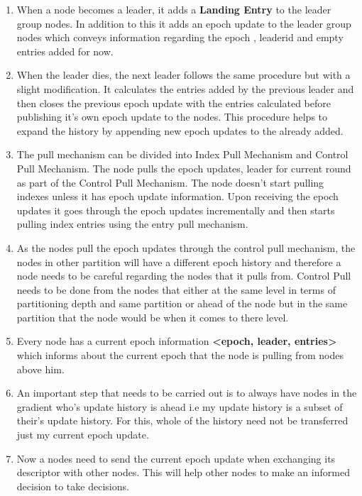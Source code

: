 \documentclass[a4paper, 11pt]{article}
\begin{document}
\begin{enumerate}

\item When a node becomes a leader, it adds a \textbf{Landing Entry} to the leader group nodes. In addition to this it adds an epoch update to the leader group nodes which conveys information regarding the epoch , leaderid and empty entries added for now.

\item When the leader dies, the next leader follows the same procedure but with a slight modification. It calculates the entries added by the previous leader and then closes the previous epoch update with the entries calculated before publishing it's own epoch update to the nodes. This procedure helps to expand the history by appending new epoch updates to the already added.

\item The pull mechanism can be divided into Index Pull Mechanism and Control Pull Mechanism. The node pulls the epoch updates, leader for current round as part of the Control Pull Mechanism. The node doesn't start pulling indexes unless it has epoch update information. Upon receiving the epoch updates it goes through the epoch updates incrementally and then starts pulling index entries using the entry pull mechanism.

\item As the nodes pull the epoch updates through the control pull mechanism, the nodes in other partition will have a different epoch history and therefore a node needs to be careful regarding the nodes that it pulls from.
Control Pull needs to be done from the nodes that either at the same level in terms of partitioning depth and same partition or ahead of the node but in the same partition that the node would be when it comes to there level.

\item Every node has a current epoch information \textbf{ \textless epoch, leader, entries\textgreater } which informs about the current epoch that the node is pulling from nodes above him. 

\item An important step that needs to be carried out is to always have nodes in the gradient who's update history is ahead i.e my update history is a subset of their's update history. For this, whole of the history need not be transferred just my current epoch update. 

\item Now a nodes need to send the current epoch update when exchanging its descriptor with other nodes. This will help other nodes to make an informed decision to take decisions.

\end{enumerate}
\end{document}
